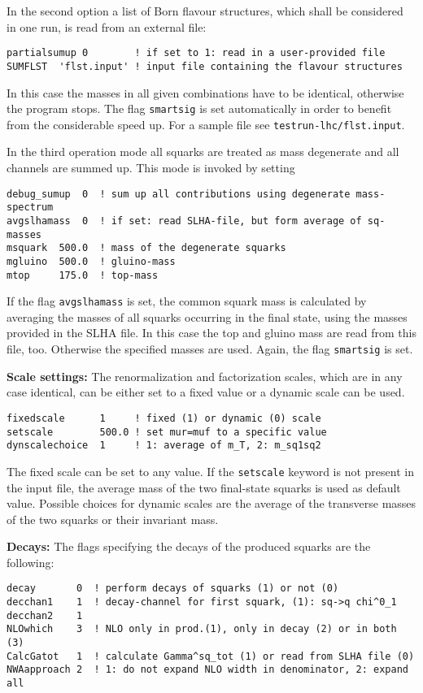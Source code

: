 \documentclass[a4paper,11pt]{article}
\begin{document}
 In the second option a list of Born flavour structures, which shall be considered in one run, is read from an external file:
\begin{verbatim}
partialsumup 0        ! if set to 1: read in a user-provided file
SUMFLST  'flst.input' ! input file containing the flavour structures
\end{verbatim}
 In this case the masses in all given combinations have to be identical, otherwise the program stops. The flag {\tt smartsig} is set automatically in order to benefit from the considerable speed up. For a sample file see {\tt testrun-lhc/flst.input}.

 In the third operation mode all squarks are treated as mass degenerate and all channels are summed up. This mode is invoked by setting
\begin{verbatim}
debug_sumup  0  ! sum up all contributions using degenerate mass-spectrum
avgslhamass  0  ! if set: read SLHA-file, but form average of sq-masses
msquark  500.0  ! mass of the degenerate squarks
mgluino  500.0  ! gluino-mass
mtop     175.0  ! top-mass
\end{verbatim}
If the flag {\tt avgslhamass} is set, the common squark mass is calculated by averaging the masses of all squarks occurring in the final state, using the masses provided in the SLHA file. In this case the top and gluino mass are read from this file, too. Otherwise the specified masses are used. Again, the flag {\tt smartsig} is set. 
\item \textbf{Scale settings:} The renormalization and factorization scales, which are in any case identical, can be either set to a fixed value or a dynamic scale can be used.
\begin{verbatim}
fixedscale      1     ! fixed (1) or dynamic (0) scale
setscale        500.0 ! set mur=muf to a specific value
dynscalechoice  1     ! 1: average of m_T, 2: m_sq1sq2
\end{verbatim}
The fixed scale can be set to any value. If the {\tt setscale} keyword is not present in the input file, the average mass of the two final-state squarks is used as default value. Possible choices for dynamic scales are the average of the transverse masses of the two squarks or their invariant mass.
\item \textbf{Decays:} The flags specifying the decays of the produced squarks are the following:
\begin{verbatim}
decay       0  ! perform decays of squarks (1) or not (0)
decchan1    1  ! decay-channel for first squark, (1): sq->q chi^0_1
decchan2    1
NLOwhich    3  ! NLO only in prod.(1), only in decay (2) or in both (3)
CalcGatot   1  ! calculate Gamma^sq_tot (1) or read from SLHA file (0)
NWAapproach 2  ! 1: do not expand NLO width in denominator, 2: expand all
\end{verbatim}
\end{document}
